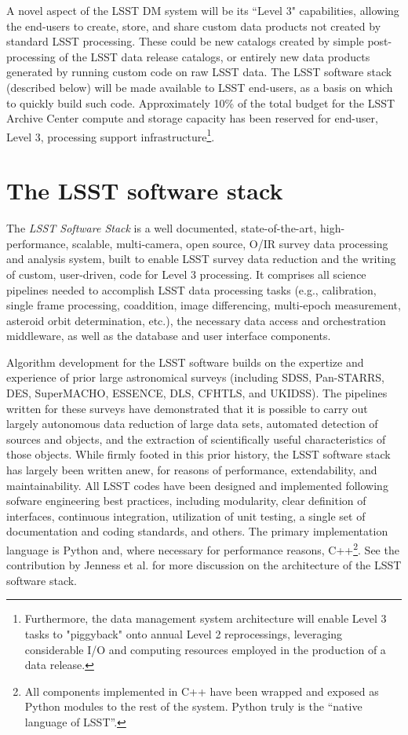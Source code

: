 \documentclass[11pt,twoside]{article}
\begin{document}
A novel aspect of the LSST DM system will be its ``Level 3"
capabilities, allowing the end-users to create, store, and share
custom data products not created by standard LSST processing. These
could be new catalogs created by simple post-processing of the LSST
data release catalogs, or entirely new data products generated by
running custom code on raw LSST data. The LSST software stack (described
below) will be made available to LSST end-users, as a basis on which
to quickly build such code. Approximately 10\% of the total
budget for the LSST Archive Center compute and storage capacity has
been reserved for end-user, Level 3, processing support
infrastructure\footnote{Furthermore, the data management system 
architecture will enable Level 3 tasks to "piggyback" onto annual 
Level 2 reprocessings, leveraging considerable I/O and
computing resources employed in the production of a data release.}. 

\section{The LSST software stack}
\label{sec:dmstack}

The {\em LSST Software Stack} is a well documented, state-of-the-art,
high-performance, scalable, multi-camera, open source, O/IR survey
data processing and analysis system, built to enable LSST survey data
reduction and the writing of custom, user-driven, code for Level 3
processing. It comprises 
all science pipelines needed to accomplish LSST data processing tasks
(e.g., calibration, single frame processing, coaddition, image
differencing, multi-epoch measurement, asteroid orbit determination,
etc.), the necessary data 
access and orchestration middleware, as well as the database and user
interface components. 

Algorithm development for the LSST software builds on the expertize
and experience of prior large astronomical surveys (including SDSS,
Pan-STARRS, DES,  
SuperMACHO, ESSENCE,  DLS, CFHTLS, and UKIDSS). The pipelines written 
for these surveys have demonstrated that it is possible to carry out
largely autonomous data 
reduction of large data sets, automated detection of sources and
objects, and the  
extraction of scientifically useful characteristics of those objects. 
While firmly footed in this prior history, the LSST software stack has 
largely been written anew, for reasons of performance, extendability, and
maintainability. All LSST codes have been designed and implemented 
following sofware engineering best practices, including modularity, clear definition
of interfaces, continuous integration, 
utilization of unit testing, a single set of documentation and coding
standards, and others. The primary implementation language is Python and, where
necessary for performance reasons, C++\footnote{All components implemented 
in C++ have been wrapped and exposed as Python modules to the rest 
of the system. Python truly is the ``native language of LSST''.}.
See the contribution by Jenness et al. for more discussion on the 
architecture of the LSST software stack.
\end{document}
